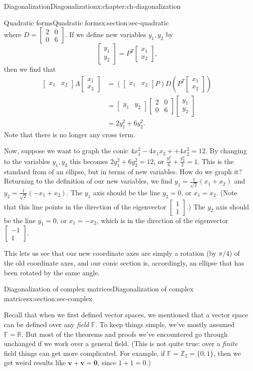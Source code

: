 \documentclass[oneside,10pt,]{book}
\numberwithin{equation}{section}
\newcommand{\bbm}{\begin{bmatrix}}
\newcommand{\ebm}{\end{bmatrix}}
\newcommand{\vv}{\mathbf{v}}
\newcommand{\amp}{&}
\begin{document}
\begin{chapterptx}{Diagonalization}{}{Diagonalization}{}{}{x:chapter:ch-diagonalization}
\begin{sectionptx}{Quadratic forms}{}{Quadratic forms}{}{}{x:section:sec-quadratic}
\begin{equation*}
\end{equation*}
where \(D = \bbm 2\amp 0\\0\amp 6\ebm\). If we define new variables \(y_1,y_2\) by%
\begin{equation*}
\bbm y_1\\y_2\ebm = P^T\bbm x_1\\x_2\ebm\text{,}
\end{equation*}
then we find that%
\begin{align*}
\bbm x_1\amp x_2\ebm A\bbm x_1\\x_2\ebm \amp = (\bbm x_1\amp x_2\ebm P)D\left(P^T\bbm x_1\\x_2\ebm\right) \\
\amp = \bbm y_1 \amp y_2\ebm\bbm 2\amp 0\\0\amp 6\ebm\bbm y_1\\y_2\ebm\\
\amp = 2y_1^2+6y_2^2\text{.}
\end{align*}
Note that there is no longer any cross term.%
\par
Now, suppose we want to graph the conic \(4x_1^2-4x_1x_2++4x_2^2=12\). By changing to the variables \(y_1,y_2\) this becomes \(2y_1^2+6y_2^2=12\), or \(\frac{y_1^2}{6}+\frac{y_2^2}{2}=1\). This is the standard from of an ellipse, but in terms of new variables. How do we graph it? Returning to the definition of our new variables, we find \(y_1=\frac{1}{\sqrt{2}}(x_1+x_2)\) and \(y_2=\frac{1}{\sqrt{2}}(-x_1+x_2)\). The \(y_1\) axis should be the line \(y_2=0\), or \(x_1=x_2\). (Note that this line points in the direction of the eigenvector \(\bbm 1\\1\ebm\).) The \(y_2\) axis should be the line \(y_1=0\), or \(x_1=-x_2\), which is in the direction of the eigenvector \(\bbm -1\\1\ebm\).%
\par
This lets us see that our new coordinate axes are simply a rotation (by \(\pi/4\)) of the old coordinate axes, and our conic section is, accordingly, an ellipse that has been rotated by the same angle.%
\end{sectionptx}
%
%
\typeout{************************************************}
\typeout{************************************************}
%
\begin{sectionptx}{Diagonalization of complex matrices}{}{Diagonalization of complex matrices}{}{}{x:section:sec-complex}
\begin{introduction}{}%
Recall that when we first defined vector spaces, we mentioned that a vector space can be defined over any \emph{field} \(\mathbb{F}\). To keep things simple, we've mostly assumed \(\mathbb{F}=\mathbb{R}\). But most of the theorems and proofs we've encountered go through unchanged if we work over a general field. (This is not quite true: over a \emph{finite} field things can get more complicated. For example, if \(\mathbb{F}=\mathbb{Z}_2=\{0,1\}\), then we get weird results like \(\vv+\vv=\mathbf{0}\), since \(1+1=0\).)%

\end{introduction}
\end{sectionptx}
\end{chapterptx}
\end{document}
